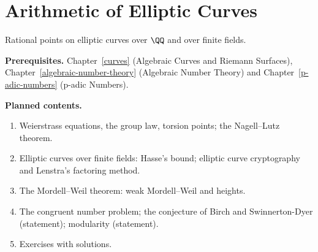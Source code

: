\chapter{Arithmetic of Elliptic Curves}\label{elliptic-curves-arithmetic}

Rational points on elliptic curves over $\QQ$ and over finite fields.

\noindent\textbf{Prerequisites.} Chapter~\ref{curves} (Algebraic Curves and Riemann Surfaces), Chapter~\ref{algebraic-number-theory} (Algebraic Number Theory) and Chapter~\ref{p-adic-numbers} (p-adic Numbers).

\noindent\textbf{Planned contents.}
\begin{enumerate}
\item Weierstrass equations, the group law, torsion points; the Nagell--Lutz theorem.
\item Elliptic curves over finite fields: Hasse's bound; elliptic curve cryptography and Lenstra's factoring method.
\item The Mordell--Weil theorem: weak Mordell--Weil and heights.
\item The congruent number problem; the conjecture of Birch and Swinnerton-Dyer (statement); modularity (statement).
\item Exercises with solutions.
\end{enumerate}
